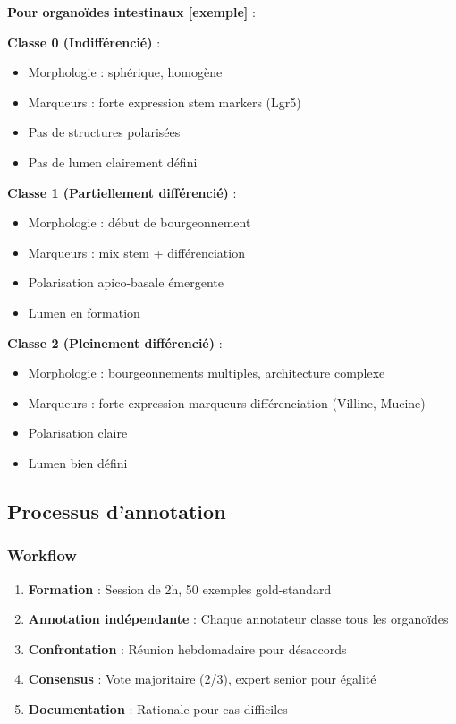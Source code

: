 \textbf{Pour organoïdes intestinaux [exemple]} :

\textbf{Classe 0 (Indifférencié)} :
\begin{itemize}
    \item Morphologie : sphérique, homogène
    \item Marqueurs : forte expression stem markers (Lgr5)
    \item Pas de structures polarisées
    \item Pas de lumen clairement défini
\end{itemize}

\textbf{Classe 1 (Partiellement différencié)} :
\begin{itemize}
    \item Morphologie : début de bourgeonnement
    \item Marqueurs : mix stem + différenciation
    \item Polarisation apico-basale émergente
    \item Lumen en formation
\end{itemize}

\textbf{Classe 2 (Pleinement différencié)} :
\begin{itemize}
    \item Morphologie : bourgeonnements multiples, architecture complexe
    \item Marqueurs : forte expression marqueurs différenciation (Villine, Mucine)
    \item Polarisation claire
    \item Lumen bien défini
\end{itemize}

\subsection{Processus d'annotation}

\subsubsection{Workflow}

\begin{enumerate}
    \item \textbf{Formation} : Session de 2h, 50 exemples gold-standard
    \item \textbf{Annotation indépendante} : Chaque annotateur classe tous les organoïdes
    \item \textbf{Confrontation} : Réunion hebdomadaire pour désaccords
    \item \textbf{Consensus} : Vote majoritaire (2/3), expert senior pour égalité
    \item \textbf{Documentation} : Rationale pour cas difficiles
\end{enumerate}

